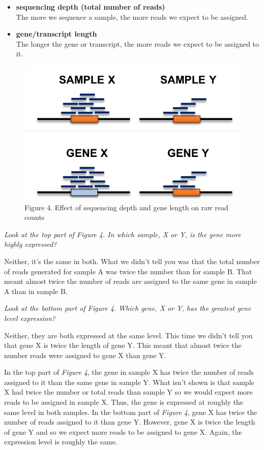 \documentclass[11pt]{article}
\begin{document}
\begin{itemize}
\item
  \textbf{sequencing depth (total number of reads)}\\
  The more we sequence a sample, the more reads we expect to be
  assigned.
\item
  \textbf{gene/transcript length}\\
  The longer the gene or transcript, the more reads we expect to be
  assigned to it.
\end{itemize}

    \begin{figure}[!h]
\centering
\includegraphics{images/count-bias.png}
\caption{Figure 4. Effect of sequencing depth and gene length on raw
read counts}
\end{figure}

\newpage

    \textit{Look at the top part of Figure 4. In which sample, X or Y, is the
gene more highly expressed?}

Neither, it's the same in both. What we didn't tell you was that the
total number of reads generated for sample A was twice the number than
for sample B. That meant almost twice the number of reads are assigned
to the same gene in sample A than in sample B.

\textit{Look at the bottom part of Figure 4. Which gene, X or Y, has the
greatest gene level expression?}

Neither, they are both expressed at the same level. This time we didn't
tell you that gene X is twice the length of gene Y. This meant that
almost twice the number reads were assigned to gene X than gene Y.

In the top part of \textit{Figure 4}, the gene in sample X has twice the
number of reads assigned to it than the same gene in sample Y. What
isn't shown is that sample X had twice the number or total reads than
sample Y so we would expect more reads to be assigned in sample X. Thus,
the gene is expressed at roughly the same level in both samples. In the
bottom part of \textit{Figure 4}, gene X has twice the number of reads
assigned to it than gene Y. However, gene X is twice the length of gene
Y and so we expect more reads to be assigned to gene X. Again, the
expression level is roughly the same.
\end{document}
